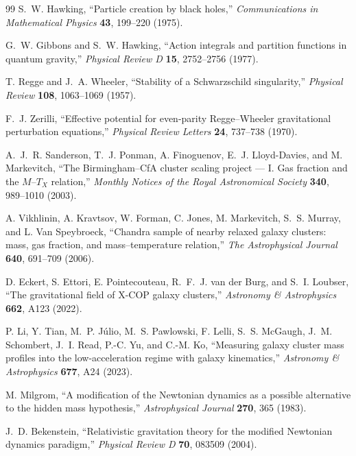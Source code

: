 \documentclass[11pt]{article}
\begin{document}
\begin{thebibliography}{99}
S.~W. Hawking,
``Particle creation by black holes,''
\emph{Communications in Mathematical Physics} \textbf{43}, 199--220 (1975).

G.~W. Gibbons and S.~W. Hawking,
``Action integrals and partition functions in quantum gravity,''
\emph{Physical Review D} \textbf{15}, 2752--2756 (1977).

T. Regge and J.~A. Wheeler,
``Stability of a Schwarzschild singularity,''
\emph{Physical Review} \textbf{108}, 1063--1069 (1957).

F.~J. Zerilli,
``Effective potential for even-parity Regge--Wheeler gravitational perturbation equations,''
\emph{Physical Review Letters} \textbf{24}, 737--738 (1970).

A.~J.~R. Sanderson, T.~J. Ponman, A. Finoguenov, E.~J. Lloyd-Davies, and M. Markevitch,
``The Birmingham--CfA cluster scaling project --- I. Gas fraction and the $M$--$T_X$ relation,''
\emph{Monthly Notices of the Royal Astronomical Society} \textbf{340}, 989--1010 (2003).

A. Vikhlinin, A. Kravtsov, W. Forman, C. Jones, M. Markevitch, S.~S. Murray, and L. Van Speybroeck,
``Chandra sample of nearby relaxed galaxy clusters: mass, gas fraction, and mass--temperature relation,''
\emph{The Astrophysical Journal} \textbf{640}, 691--709 (2006).

D. Eckert, S. Ettori, E. Pointecouteau, R.~F.~J. van der Burg, and S.~I. Loubser,
``The gravitational field of X-COP galaxy clusters,''
\emph{Astronomy \& Astrophysics} \textbf{662}, A123 (2022).

P. Li, Y. Tian, M.~P. J\'ulio, M.~S. Pawlowski, F. Lelli, S.~S. McGaugh, J.~M. Schombert, J.~I. Read, P.-C. Yu, and C.-M. Ko,
``Measuring galaxy cluster mass profiles into the low-acceleration regime with galaxy kinematics,''
\emph{Astronomy \& Astrophysics} \textbf{677}, A24 (2023).

M. Milgrom,
``A modification of the Newtonian dynamics as a possible alternative to the hidden mass hypothesis,''
\emph{Astrophysical Journal} \textbf{270}, 365 (1983).

J.~D. Bekenstein,
``Relativistic gravitation theory for the modified Newtonian dynamics paradigm,''
\emph{Physical Review D} \textbf{70}, 083509 (2004).


\end{thebibliography}
\end{document}

